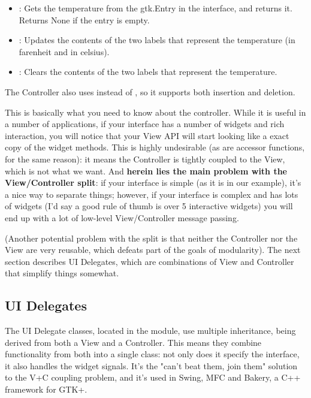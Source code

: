 \documentclass[a4paper]{howto}
\begin{document}
\begin{itemize}
\item {}: Gets the temperature from the gtk.Entry in the
interface, and returns it. Returns None if the entry is empty.
\item {}: Updates the contents of the two labels that
represent the temperature (in farenheit and in celsius).
\item {}: Clears the contents of the two labels that
represent the temperature.
\end{itemize}

The Controller also uses  instead of ,
so it supports both insertion and deletion.

This is basically what you need to know about the controller. While it
is useful in a number of applications, if your interface has a number of
widgets and rich interaction, you will notice that your View API will
start looking like a exact copy of the widget methods. This is highly
undesirable (as are accessor functions, for the same reason): it means
the Controller is tightly coupled to the View, which is not what we
want. And {\bf herein lies the main problem with the View/Controller
split}: if your interface is simple (as it is in our example), it's a
nice way to separate things; however, if your interface is complex and
has lots of widgets (I'd say a good rule of thumb is over 5 interactive
widgets) you will end up with a lot of low-level View/Controller message
passing.

(Another potential problem with the split is that neither the Controller
nor the View are very reusable, which defeats part of the goals of
modularity). The next section describes UI Delegates, which are
combinations of View and Controller that simplify things somewhat.

\subsection{UI Delegates}

The UI Delegate classes, located in the  module, use
multiple inheritance, being derived from both a View and a Controller.
This means they combine functionality from both into a single class: not
only does it specify the interface, it also handles the widget signals.
It's the "can't beat them, join them" solution to the V+C coupling
problem, and it's used in Swing, MFC and Bakery, a C++ framework for
GTK+.
\end{document}
